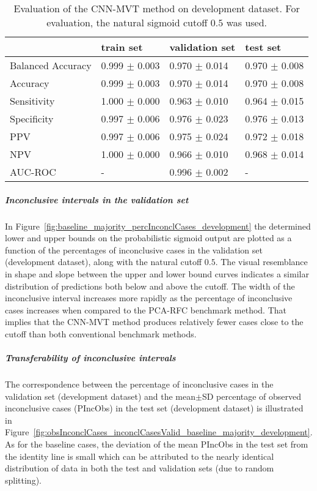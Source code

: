 \begin{table}[ht]
  \caption{Evaluation of the CNN-MVT method on development dataset. 
  For evaluation, the natural sigmoid cutoff $0.5$ was used.}
  \centering
  \begin{tabular}{llll}
      \hline
                        & train set         & validation set      & test set             \\
      \hline
      Balanced Accuracy & 0.999 $\pm$ 0.003   &  0.970 $\pm$ 0.014    &  0.970 $\pm$ 0.008   \\
      Accuracy          & 0.999 $\pm$ 0.003    &   0.970 $\pm$ 0.014   &  0.970 $\pm$ 0.008   \\
      Sensitivity       &  1.000 $\pm$ 0.000   &   0.963 $\pm$ 0.010   &  0.964 $\pm$ 0.015  \\
      Specificity       &   0.997 $\pm$ 0.006   &   0.976 $\pm$ 0.023  &   0.976 $\pm$ 0.013  \\
      PPV               &  0.997 $\pm$ 0.006   &   0.975 $\pm$ 0.024   &  0.972 $\pm$ 0.018 \\
      NPV               &  1.000 $\pm$ 0.000    &   0.966 $\pm$ 0.010   & 0.968 $\pm$ 0.014  \\
      \hline
      AUC-ROC          & -                    & 0.996 $\pm$ 0.002 &     -  \\
      \hline
  \end{tabular}
 \label{t1:cnn_mvt_perf_eval_table}
\end{table}

\subparagraph{Inconclusive intervals in the validation set}

In Figure~\ref{fig:baseline_majority_percInconclCases_development} the determined lower and upper bounds on the 
probabilistic sigmoid output are plotted as a function of the percentages of inconclusive cases 
in the validation set (development dataset), along with the natural cutoff $0.5$.
The visual resemblance in shape and slope between the upper and lower bound curves 
indicates a similar distribution of predictions both below and above the cutoff.
The width of the inconclusive interval increases more rapidly as the percentage of inconclusive cases increases 
when compared to the PCA-RFC benchmark method.
That implies that the CNN-MVT method produces relatively fewer cases close to the cutoff than 
both conventional benchmark methods.

\subparagraph{Transferability of inconclusive intervals}

The correspondence between the percentage of inconclusive cases in the validation set (development dataset) and 
the mean$\pm$SD percentage of observed inconclusive cases (PIncObs) in the test set (development dataset) 
is illustrated in Figure~\ref{fig:obsInconclCases_inconclCasesValid_baseline_majority_development}.
As for the baseline cases, the deviation of the mean PIncObs in the test set from the 
identity line is small which can be attributed to the nearly identical distribution of data in both the test and validation sets 
(due to random splitting).


